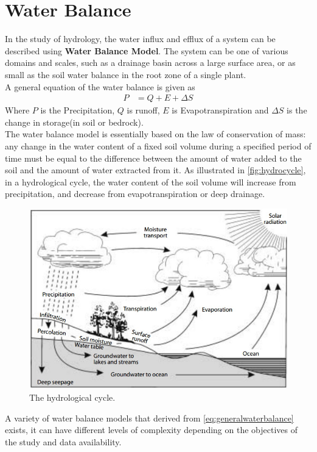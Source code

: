 
\chapter{Water Balance} %

\label{ch:WaterBalance} %

In the study of hydrology, the water influx and efflux of a system can be described using \textbf{Water Balance Model}. The system can be one of various domains and scales, such as a drainage basin across a large surface area\citep{Kirby2008}, or as small as the soil water balance in the root zone of a single plant\citep{Zhang2002}.\\
\newline
A general equation of the water balance is given as
\begin{align}
P&=Q+E+\Delta S\label{eq:generalwaterbalance}
\end{align}
Where $P$ is the Precipitation, $Q$ is runoff, $E$ is Evapotranspiration and $\Delta S$ is the change in storage(in soil or bedrock).\\
\newline
The water balance model is essentially based on the law of conservation of mass: any change in the water content of a fixed soil volume during a specified period of time must be equal to the difference between the amount of water added to the soil and the amount of water extracted from it. As illustrated in \autoref{fig:hydrocycle}, in a hydrological cycle, the water content of the soil volume will increase from precipitation, and decrease from evapotranspiration or deep drainage.
\begin{figure}[bth]
\begin{center}
\includegraphics[width=.85\linewidth]{gfx/hydrocycle}
\end{center}
\caption{The hydrological cycle\citep{Zhang2002}.}
\label{fig:hydrocycle}
\end{figure}
\newline
A variety of water balance models that derived from \autoref{eq:generalwaterbalance} exists, it can have different levels of complexity depending on the objectives of the study and data availability. 
